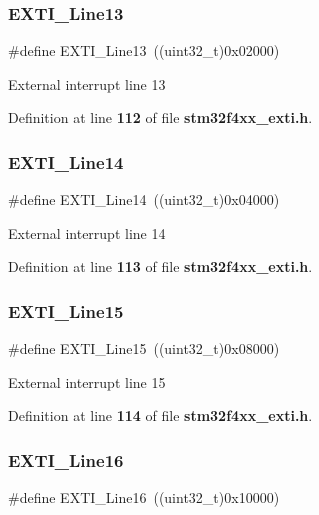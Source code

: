 \subsubsection{E\+X\+T\+I\+\_\+\+Line13}
{\footnotesize\ttfamily \#define E\+X\+T\+I\+\_\+\+Line13~((uint32\+\_\+t)0x02000)}

External interrupt line 13 

Definition at line \textbf{ 112} of file \textbf{ stm32f4xx\+\_\+exti.\+h}.

\mbox{\label{group__EXTI__Lines_ga7b3821ad1b7a00b49c27075688f48101}} 
\subsubsection{E\+X\+T\+I\+\_\+\+Line14}
{\footnotesize\ttfamily \#define E\+X\+T\+I\+\_\+\+Line14~((uint32\+\_\+t)0x04000)}

External interrupt line 14 

Definition at line \textbf{ 113} of file \textbf{ stm32f4xx\+\_\+exti.\+h}.

\mbox{\label{group__EXTI__Lines_gafc5ea85d1fc095a855fde8977a338c4c}} 
\subsubsection{E\+X\+T\+I\+\_\+\+Line15}
{\footnotesize\ttfamily \#define E\+X\+T\+I\+\_\+\+Line15~((uint32\+\_\+t)0x08000)}

External interrupt line 15 

Definition at line \textbf{ 114} of file \textbf{ stm32f4xx\+\_\+exti.\+h}.

\mbox{\label{group__EXTI__Lines_ga21326db7db8ca614c746b7f52dc45ead}} 
\subsubsection{E\+X\+T\+I\+\_\+\+Line16}
{\footnotesize\ttfamily \#define E\+X\+T\+I\+\_\+\+Line16~((uint32\+\_\+t)0x10000)}

